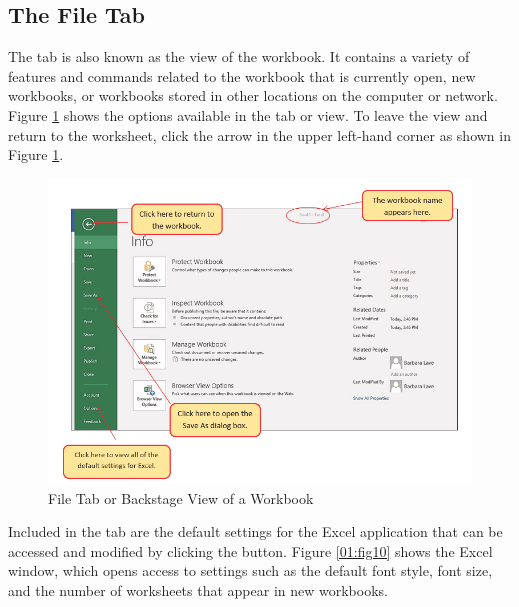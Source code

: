 \subsection{The File Tab}

The  tab is also known as the  view of the workbook. It contains a variety of features and commands related to the workbook that is currently open, new workbooks, or workbooks stored in other locations on the computer or network. Figure \ref{01:fig09} shows the options available in the  tab or  view. To leave the  view and return to the worksheet, click the arrow in the upper left-hand corner as shown in Figure \ref{01:fig09}.

\begin{figure}[H]
	\centering
	\includegraphics[width=\maxwidth{.95\linewidth}]{gfx/ch01_fig09}
	\caption{File Tab or Backstage View of a Workbook}
	\label{01:fig09}
\end{figure}

Included in the  tab are the default settings for the Excel application that can be accessed and modified by clicking the  button. Figure \ref{01:fig10} shows the Excel  window, which opens access to settings such as the default font style, font size, and the number of worksheets that appear in new workbooks.

